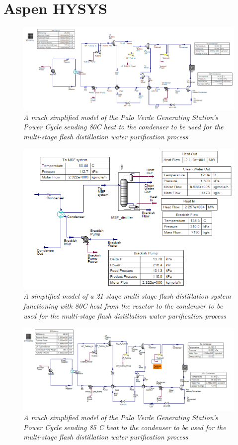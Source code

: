 \documentclass[12pt]{UIdahoMastersThesis}
\begin{document}
\chapter{Aspen HYSYS}
\begin{figure}
\includegraphics[width=\textwidth]{80PC.PNG}
\caption{\small \sl A much simplified model of the Palo Verde Generating Station's Power Cycle sending 80\degree C heat to the condenser to be used for the multi-stage flash distillation water purification process}
\end{figure}
\begin{figure}
\includegraphics[width=\textwidth]{80MSF.PNG}
\caption{\small \sl A simplified model of a 21 stage multi stage flash distillation system functioning with 80\degree C heat from the reactor to the condenser to be used for the multi-stage flash distillation water purification process}
\end{figure}
\begin{figure}
\includegraphics[width=\textwidth]{85PC.PNG}
\caption{\small \sl A much simplified model of the Palo Verde Generating Station's Power Cycle sending 85 \degree C heat to the condenser to be used for the multi-stage flash distillation water purification process}
\end{figure}
\end{document}
